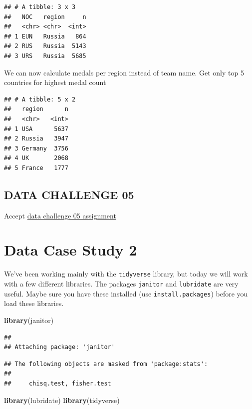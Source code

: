 \documentclass[
]{book}
\newenvironment{Shaded}{\begin{snugshade}}{\end{snugshade}}
\newcommand{\KeywordTok}[1]{\textcolor[rgb]{0.13,0.29,0.53}{\textbf{#1}}}
\newcommand{\NormalTok}[1]{#1}
\begin{document}
\begin{verbatim}
## # A tibble: 3 x 3
##   NOC   region     n
##   <chr> <chr>  <int>
## 1 EUN   Russia   864
## 2 RUS   Russia  5143
## 3 URS   Russia  5685
\end{verbatim}

We can now calculate medals per region instead of team name.
Get only top 5 countries for highest medal count

\begin{verbatim}
## # A tibble: 5 x 2
##   region      n
##   <chr>   <int>
## 1 USA      5637
## 2 Russia   3947
## 3 Germany  3756
## 4 UK       2068
## 5 France   1777
\end{verbatim}

\hypertarget{data-challenge-05}{%
\section{DATA CHALLENGE 05}\label{data-challenge-05}}

Accept \href{https://classroom.github.com/a/lxjBRX4h}{data challenge 05 assignment}

\hypertarget{data-case-study-2}{%
\chapter{Data Case Study 2}\label{data-case-study-2}}

We've been working mainly with the \texttt{tidyverse} library, but today we will work with a few different libraries. The packages \texttt{janitor} and \texttt{lubridate} are very useful. Maybe sure you have these installed (use \texttt{install.packages}) before you load these libraries.

\begin{Shaded}
\begin{Highlighting}[]
\KeywordTok{library}\NormalTok{(janitor)}
\end{Highlighting}
\end{Shaded}

\begin{verbatim}
## 
## Attaching package: 'janitor'
\end{verbatim}

\begin{verbatim}
## The following objects are masked from 'package:stats':
## 
##     chisq.test, fisher.test
\end{verbatim}

\begin{Shaded}
\begin{Highlighting}[]
\KeywordTok{library}\NormalTok{(lubridate)}
\KeywordTok{library}\NormalTok{(tidyverse)}
\end{Highlighting}
\end{Shaded}
\end{document}
